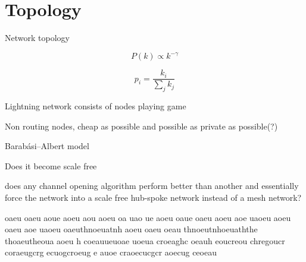 \section{Topology}

Network topology

\[ P(k) \propto k^{-\gamma} \]

\[ p_i = \dfrac{k_i}{\sum_{j}^{}k_j}  \]


Lightning network consists of nodes playing game

Non routing nodes, cheap as possible and possible as private as possible(?) 

Barabási–Albert model

Does it become scale free

does any channel opening algorithm perform better than another and essentially force the network into a scale free hub-spoke network instead of a mesh network?


oaeu
oaeu
aoue
aoeu
aou
aoeu
oa
uao
ue
aoeu
oaue
oaeu
aoeu
aoe
uaoeu aoeu oaeu aoe uaoeu oaeuthnoeuatnh 
aoeu oaeu oeau thnoeutnhoeuaththe thoaeutheoua 
aoeu h
coeauueuoae uoeua croeaghc oeauh eoucreou chregoucr 
coraeugcrg ecuogcroeug e auoe craoecucgcr aoecug ceoeau 


\newpage
\onecolumn

